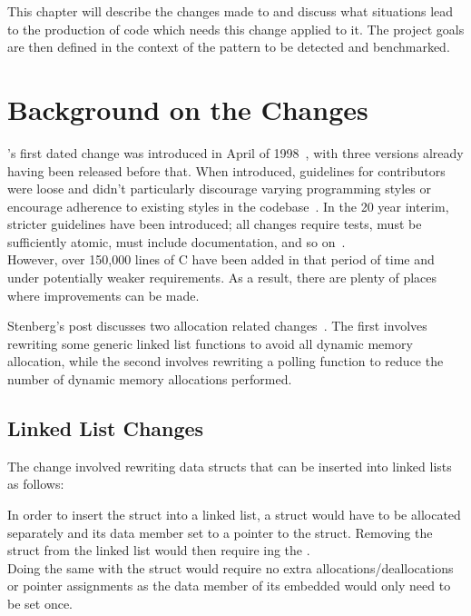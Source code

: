 This chapter will describe the changes made to  and discuss what situations lead to the production of code which needs this change applied to it. The project goals are then defined in the context of the pattern to be detected and benchmarked.

\section{Background on the Changes}\label{backgroundsec}

's first dated change was introduced in April of 1998~\cite{curlrelease}, with three versions already having been released before that. When introduced, guidelines for contributors were loose and didn't particularly discourage varying programming styles or encourage adherence to existing styles in the codebase~\cite{curlcontribute1999}. In the 20 year interim, stricter guidelines have been introduced; all changes require tests, must be sufficiently atomic, must include documentation, and so on~\cite{curlcontribute2017}.\\
However, over 150,000 lines of C have been added in that period of time and under potentially weaker requirements. As a result, there are plenty of places where improvements can be made.

Stenberg's post discusses two allocation related changes~\cite{curlmalloc}. The first involves rewriting some generic linked list functions to avoid all dynamic memory allocation, while the second involves rewriting a polling function to reduce the number of dynamic memory allocations performed.

\subsection{Linked List Changes}

The change involved rewriting data structs that can be inserted into linked lists as follows:



In order to insert the  struct into a linked list, a  struct would have to be allocated separately and its data member set to a pointer to the  struct. Removing the  struct from the linked list would then require \free{}ing the .\\
Doing the same with the  struct would require no extra allocations/deallocations or pointer assignments as the data member of its embedded  would only need to be set once.

